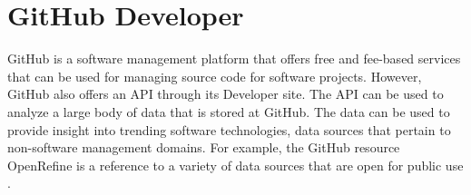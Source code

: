 \section{GitHub Developer}

GitHub is a software management platform that offers free and fee-based
services that can be used for managing source code for software projects.
However, GitHub also offers an API through its Developer site.  The API
can be used to analyze a large body of data that is stored at GitHub.  The
data can be used to provide insight into trending software technologies, data
sources that pertain to non-software management domains.  For example, the
GitHub resource OpenRefine\cite{hid-sp18-505-OpenRefine2018} is a reference
to a variety of data sources that are open for public use
\cite{hid-sp18-505-GitHub2018}.
